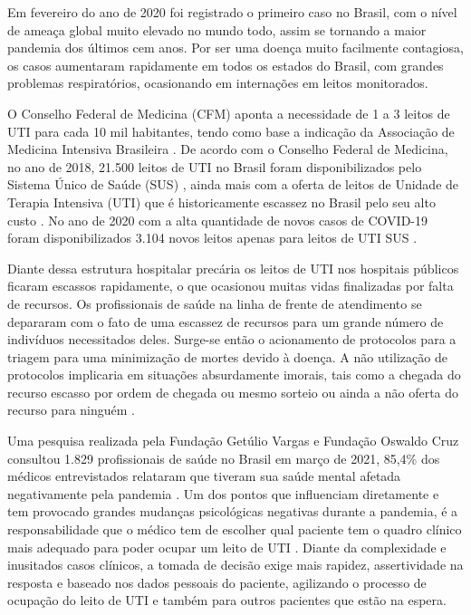 \documentclass[12pt]{article}
\begin{document}
Em fevereiro do ano de 2020 foi registrado o primeiro caso no Brasil, com o nível de ameaça global muito elevado no mundo todo, assim se tornando a maior pandemia dos últimos cem anos.
Por ser uma doença muito facilmente contagiosa, os casos aumentaram rapidamente em todos os estados do Brasil, com grandes problemas respiratórios, ocasionando em internações em leitos monitorados.

O Conselho Federal de Medicina (CFM) aponta a necessidade de 1 a 3 leitos de UTI para cada 10 mil habitantes, tendo como base a indicação da Associação de Medicina Intensiva Brasileira \cite{domingues2018numero}. De acordo com o Conselho Federal de Medicina, no ano de 2018, 21.500 leitos de UTI no Brasil foram disponibilizados pelo Sistema Único de Saúde (SUS) \cite{cfm2018,cfm2020}, ainda mais com a oferta de leitos de Unidade de Terapia Intensiva (UTI) que é historicamente escassez no Brasil pelo seu alto custo \cite{murthy2015intensive}. No ano de 2020 com a alta quantidade de novos casos de COVID-19 foram disponibilizados 3.104 novos leitos apenas para leitos de UTI SUS \cite{cotrim2020crescimento}.

Diante dessa estrutura hospitalar precária os leitos de UTI nos hospitais públicos ficaram escassos rapidamente, o que ocasionou muitas vidas finalizadas por falta de recursos. Os profissionais de saúde na linha de frente de atendimento se depararam com o fato de uma escassez de recursos para um grande número de indivíduos necessitados deles. Surge-se então o acionamento de protocolos para a triagem para uma minimização de mortes devido à doença. A não utilização de protocolos implicaria em situações absurdamente imorais, tais como a chegada do recurso escasso por ordem de chegada ou mesmo sorteio ou ainda a não oferta do recurso para ninguém \cite{costa2020protocolos}.

Uma pesquisa realizada pela Fundação Getúlio Vargas e Fundação Oswaldo Cruz consultou 1.829 profissionais de saúde no Brasil em março de 2021, 85,4\% dos médicos entrevistados relataram que tiveram sua saúde mental afetada negativamente pela pandemia \cite{paulomotoryn2021}. Um dos pontos que influenciam diretamente e tem provocado grandes mudanças psicológicas negativas durante a pandemia, é a responsabilidade que o médico tem de escolher qual paciente tem o quadro clínico mais adequado para poder ocupar um leito de UTI \cite{teixeira2020processo}.
Diante da complexidade e inusitados casos clínicos, a tomada de decisão exige mais rapidez, assertividade na resposta e baseado nos dados pessoais do paciente, agilizando o processo de ocupação do leito de UTI e também para outros pacientes que estão na espera.
\end{document}
